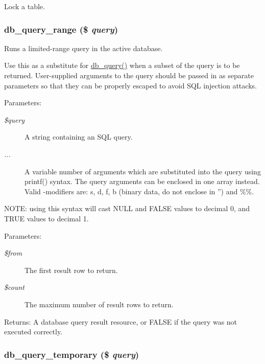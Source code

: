 Lock a table. \hypertarget{database_8mysqli_8inc_893cbcab2ecf321005eae4e278adc22b}{
\subsubsection[{db\_\-query\_\-range}]{\setlength{\rightskip}{0pt plus 5cm}db\_\-query\_\-range (\$ {\em query})}}
\label{database_8mysqli_8inc_893cbcab2ecf321005eae4e278adc22b}


Runs a limited-range query in the active database.

Use this as a substitute for \hyperlink{database_8mysql-common_8inc_9e096321b86945d128746ac7bedce8f3}{db\_\-query()} when a subset of the query is to be returned. User-supplied arguments to the query should be passed in as separate parameters so that they can be properly escaped to avoid SQL injection attacks.

\begin{Desc}
\item[Parameters:]
\begin{description}
\item[{\em \$query}]A string containing an SQL query. \item[{\em ...}]A variable number of arguments which are substituted into the query using printf() syntax. The query arguments can be enclosed in one array instead. Valid -modifiers are: s, d, f, b (binary data, do not enclose in '') and \%\%.\end{description}
\end{Desc}
NOTE: using this syntax will cast NULL and FALSE values to decimal 0, and TRUE values to decimal 1.

\begin{Desc}
\item[Parameters:]
\begin{description}
\item[{\em \$from}]The first result row to return. \item[{\em \$count}]The maximum number of result rows to return. \end{description}
\end{Desc}
\begin{Desc}
\item[Returns:]A database query result resource, or FALSE if the query was not executed correctly. \end{Desc}
\hypertarget{database_8mysqli_8inc_bce8dcddcded20016a1925824cd09efa}{
\subsubsection[{db\_\-query\_\-temporary}]{\setlength{\rightskip}{0pt plus 5cm}db\_\-query\_\-temporary (\$ {\em query})}}
\label{database_8mysqli_8inc_bce8dcddcded20016a1925824cd09efa}


